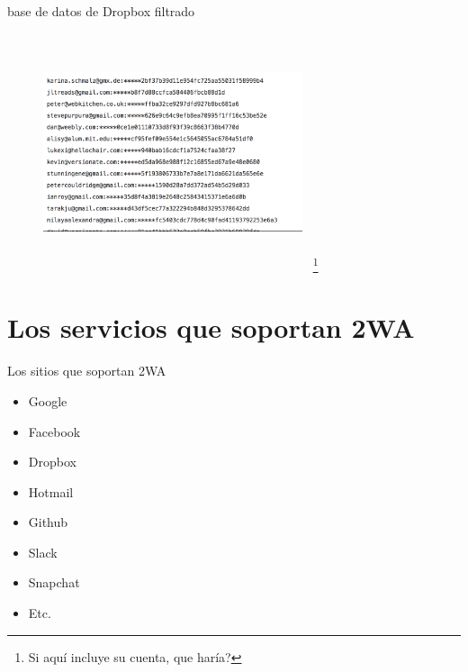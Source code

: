 \documentclass[11pt]{beamer}
\let\oldfootnote\footnote
\renewcommand\footnote[1][]{\oldfootnote[frame,#1]}
\begin{document}
\begin{frame}{base de datos de Dropbox filtrado}
  \begin{figure}[ht]
    \begin{center}
      \includegraphics[height=2.75in, width=3in]{images/dropbox-database.png}
	~\footnote{Si aqu\'i incluye su cuenta, que har\'ia?}
    \end{center}
  \end{figure}
\end{frame}
\section{Los servicios que soportan 2WA}
\begin{frame}
  \begin{exampleblock}{Los sitios que soportan 2WA}
    \begin{itemize}
      \item Google
      \item Facebook
      \item Dropbox
      \item Hotmail
      \item Github
      \item Slack
      \item Snapchat
      \item Etc.
    \end{itemize}
  \end{exampleblock}
\end{frame}
\end{document}
